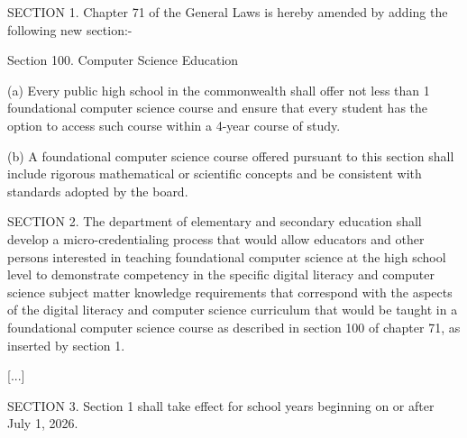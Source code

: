 \documentclass[12pt]{article}%
\begin{document}
\begin{sidebarquote}%

SECTION 1. Chapter 71 of the General Laws is hereby amended by adding the following new section:-

Section 100. Computer Science Education

(a) Every public high school in the commonwealth shall offer not less than 1 foundational computer science course and ensure that every student has the option to access such course within a 4-year course of study.

(b) A foundational computer science course offered pursuant to this section shall include rigorous mathematical or scientific concepts and be consistent with standards adopted by the board.

SECTION 2. The department of elementary and secondary education shall develop a micro-credentialing process that would allow educators and other persons interested in teaching foundational computer science at the high school level to demonstrate competency in the specific digital literacy and computer science subject matter knowledge requirements that correspond with the aspects of the digital literacy and computer science curriculum that would be taught in a foundational computer science course as described in section 100 of chapter 71, as inserted by section 1. %

[...]

SECTION 3. Section 1 shall take effect for school years beginning on or after July 1, 2026.
\end{sidebarquote}
\end{document}
